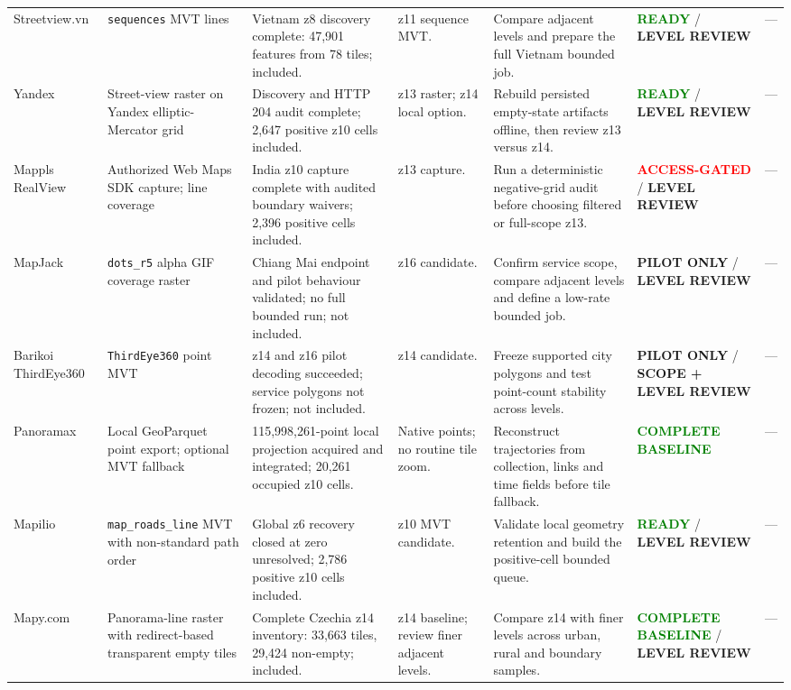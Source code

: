\documentclass[9pt,a4paper]{article}
\newcommand{\status}[2]{\textcolor{#1}{\bfseries #2}}
\begin{document}
\begin{longtable}{L{2.25cm} L{4.05cm} L{6.15cm} L{3.35cm} L{5.35cm} L{3.35cm} L{0.75cm}}
Streetview.vn & \texttt{sequences} MVT lines & Vietnam z8 discovery complete: 47,901 features from 78 tiles; included. & z11 sequence MVT. & Compare adjacent levels and prepare the full Vietnam bounded job. & \status{green}{READY} / \status{amber}{LEVEL REVIEW} & --- \\
Yandex & Street-view raster on Yandex elliptic-Mercator grid & Discovery and HTTP 204 audit complete; 2,647 positive z10 cells included. & z13 raster; z14 local option. & Rebuild persisted empty-state artifacts offline, then review z13 versus z14. & \status{green}{READY} / \status{amber}{LEVEL REVIEW} & --- \\
Mappls RealView & Authorized Web Maps SDK capture; line coverage & India z10 capture complete with audited boundary waivers; 2,396 positive cells included. & z13 capture. & Run a deterministic negative-grid audit before choosing filtered or full-scope z13. & \status{red}{ACCESS-GATED} / \status{amber}{LEVEL REVIEW} & --- \\
MapJack & \texttt{dots\_r5} alpha GIF coverage raster & Chiang Mai endpoint and pilot behaviour validated; no full bounded run; not included. & z16 candidate. & Confirm service scope, compare adjacent levels and define a low-rate bounded job. & \status{amber}{PILOT ONLY} / \status{amber}{LEVEL REVIEW} & --- \\
Barikoi ThirdEye360 & \texttt{ThirdEye360} point MVT & z14 and z16 pilot decoding succeeded; service polygons not frozen; not included. & z14 candidate. & Freeze supported city polygons and test point-count stability across levels. & \status{amber}{PILOT ONLY} / \status{amber}{SCOPE + LEVEL REVIEW} & --- \\
Panoramax & Local GeoParquet point export; optional MVT fallback & 115,998,261-point local projection acquired and integrated; 20,261 occupied z10 cells. & Native points; no routine tile zoom. & Reconstruct trajectories from collection, links and time fields before tile fallback. & \status{green}{COMPLETE BASELINE} & --- \\
Mapilio & \texttt{map\_roads\_line} MVT with non-standard path order & Global z6 recovery closed at zero unresolved; 2,786 positive z10 cells included. & z10 MVT candidate. & Validate local geometry retention and build the positive-cell bounded queue. & \status{green}{READY} / \status{amber}{LEVEL REVIEW} & --- \\
Mapy.com & Panorama-line raster with redirect-based transparent empty tiles & Complete Czechia z14 inventory: 33,663 tiles, 29,424 non-empty; included. & z14 baseline; review finer adjacent levels. & Compare z14 with finer levels across urban, rural and boundary samples. & \status{green}{COMPLETE BASELINE} / \status{amber}{LEVEL REVIEW} & --- \\
\end{longtable}
\end{document}
